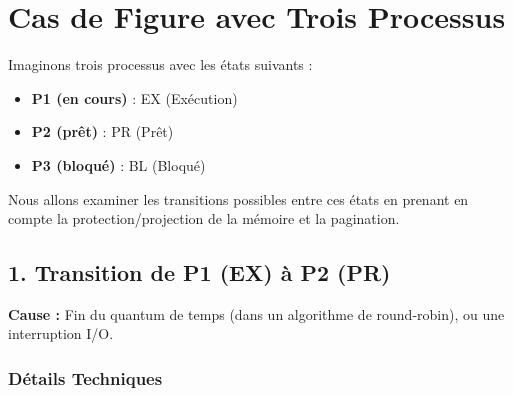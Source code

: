\section*{Cas de Figure avec Trois Processus}

Imaginons trois processus avec les états suivants :

\begin{itemize}
    \item \textbf{P1 (en cours)} : EX (Exécution)
    \item \textbf{P2 (prêt)} : PR (Prêt)
    \item \textbf{P3 (bloqué)} : BL (Bloqué)
\end{itemize}

Nous allons examiner les transitions possibles entre ces états en prenant en compte la protection/projection de la mémoire et la pagination.

\subsection*{1. Transition de P1 (EX) à P2 (PR)}

\textbf{Cause :} Fin du quantum de temps (dans un algorithme de round-robin), ou une interruption I/O.

\subsubsection*{Détails Techniques}

